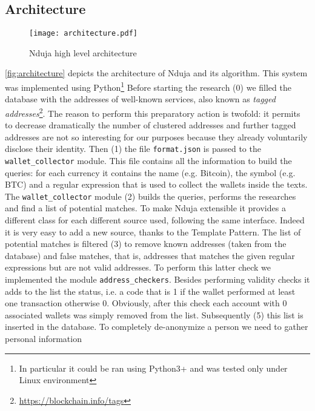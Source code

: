 \subsection{Architecture}


\begin{figure*}
	\centering
	\texttt{[image: architecture.pdf]}
	\caption{Nduja high level architecture}
	\label{fig:architecture}
\end{figure*}



\autoref{fig:architecture} depicts the architecture of Nduja and its algorithm.
This system was implemented using Python\footnote{In particular it could be ran
using Python3+ and was tested only under Linux environment}
Before starting the research (0) we filled the database with the addresses of
well-known services, also known as
\emph{tagged addresses}\footnote{\url{https://blockchain.info/tags}}.
The reason to perform this preparatory action 
is twofold: it permits to decrease dramatically the number of
clustered addresses and further tagged addresses are not so
interesting for our purposes because they already voluntarily disclose their
identity.
Then (1) the file \texttt{format.json} is passed to the \verb|wallet_collector|
module. This file contains all the information to build the queries: for each
currency it contains the name (e.g. Bitcoin), the symbol (e.g. BTC) and a
regular expression that is used to collect the wallets inside the texts.
The \verb|wallet_collector| module (2) builds the queries, performs the
researches and find a list of potential matches. To make Nduja extensible it
provides a different class for each different source used, following the same
interface. Indeed it is very easy to add a new source, thanks to the Template
Pattern.
The list of potential matches is filtered (3) to remove known addresses (taken
from the database) and false matches, that is, addresses that matches the given
regular expressions but are not valid addresses. To perform this latter check
we implemented the module \verb|address_checkers|.
Besides performing validity checks it adds to the list the status, i.e. a
code that is 1 if the wallet performed at least one transaction otherwise 0.
Obviously, after this check each account with 0 associated wallets was simply
removed from the list.
Subsequently (5) this list is inserted in the database.
To completely de-anonymize a person we need to gather personal information
